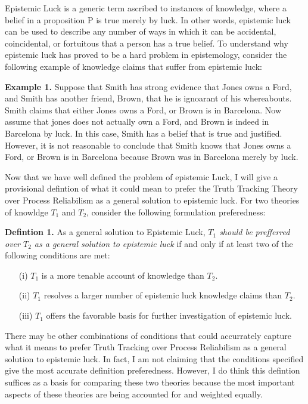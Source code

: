 \documentclass{article}
\begin{document}
Epistemic Luck is a generic term ascribed to instances of knowledge, where a
belief in a proposition P is true merely by luck. In other words, epistemic luck
can be used to describe any number of ways in which it can be accidental,
coincidental, or fortuitous that a person has a true belief. To understand why
epistemic luck has proved to be a hard problem in epistemology, consider the
following example of knowledge claims that suffer from epistemic luck:

\begin{displayquote}
\textbf{Example 1.} Suppose that Smith has strong evidence that Jones owns
a Ford, and Smith has another friend, Brown, that he is ignoarant of his whereabouts.
Smith claims that either Jones owns a Ford, or Brown is in Barcelona. Now assume that
jones does not actually own a Ford, and Brown is indeed in Barcelona by luck.
In this case, Smith has a belief that is true and justified. However, it is not
reasonable to conclude that Smith knows that Jones owns a Ford, or Brown is in Barcelona
because Brown was in Barcelona merely by luck.
\end{displayquote}


Now that we have well defined the problem of epistemic Luck, I will give a
provisional defintion of what it could mean to prefer the Truth Tracking Theory
over Process Reliabilism as a general solution to epistemic luck. For two theories
of knowldge $T_{1}$ and $T_{2}$, consider the following formulation preferedness:
\begin{displayquote}
    \textbf{Defintion 1.} As a general solution to Epistemic Luck,
    \textit{$T_{1}$ should be prefferred over $T_{2}$ as a general solution
    to epistemic luck} if and only if at least two of the following conditions are met:
    \begin{enumerate}
        \item[(i)] $T_{1}$ is a more tenable account of knowledge than $T_{2}$.
        \item[(ii)] $T_{1}$ resolves a larger number of epistemic luck knowledge claims than $T_{2}$.
        \item[(iii)] $T_{1}$ offers the favorable basis for further investigation of epistemic luck.
    \end{enumerate}
\end{displayquote}
  There may be other combinations of conditions that could accurrately capture
what it means to prefer Truth Tracking over Process Reliabilism as a general
solution to epistemic luck. In fact, I am not claiming that the conditions
specified give the most accurate definition preferedness. However, I do think
this defintion suffices as a basis for comparing these two theories because
the most important aspects of these theories are being accounted for and weighted
equally.
\end{document}
